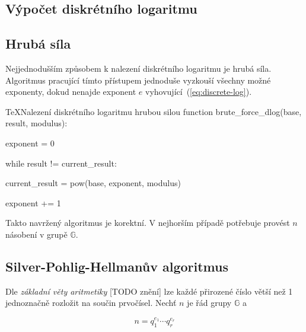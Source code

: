 \documentclass[
  program=infoi,
  biblatex,
  figures=false,
  glossaries,
  index
]{kidiplom}
\begin{document}
        \subsection{Výpočet diskrétního logaritmu}\label{sub:computing-discrete-log}


        \subsection{Hrubá síla}\label{sub:brute-forcing-discrete-log}
            Nejjednodušším způsobem k nalezení diskrétního logaritmu je hrubá síla.
            Algoritmus pracující tímto přístupem jednoduše vyzkouší všechny možné exponenty,
            dokud nenajde exponent $e$ vyhovující~(\ref{eq:discrete-log}).
            
            \begin{kicode}{TeX}{}{Nalezení diskrétního logaritmu hrubou silou}
                function brute_force_dlog(base, result, modulus):

                exponent = 0

                while result != current_result:

                    current_result = pow(base, exponent, modulus)
                                    
                    exponent += 1
        
            \end{kicode}

            Takto navržený algoritmus je korektní. V nejhorším případě potřebuje provést $n$ násobení v grupě $\mathbb{G}$.


        \subsection{Silver-Pohlig-Hellmanův algoritmus}\label{sub:silver-pohlig-hellman}

            Dle \emph{základní věty aritmetiky} [TODO znění] lze každé přirozené číslo větší než 1 jednoznačně rozložit na součin prvočísel.
            Nechť $n$ je řád grupy $\mathbb{G}$ a

                \begin{equation}\label{eq:factorization}
                    n=q_1^{e_1} \cdots q_r^{e_r}
                \end{equation}
\end{document}
